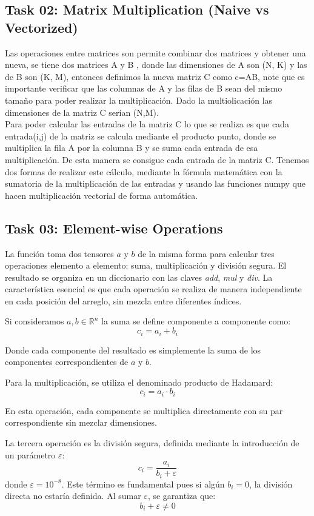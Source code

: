 \documentclass[12pt]{article}
\begin{document}
\subsection*{Task 02: Matrix Multiplication (Naive vs Vectorized)}
Las operaciones entre matrices son permite combinar dos matrices y obtener una nueva, se tiene dos matrices A
 y B , donde las dimensiones de A son (N, K) y las de B son (K, M), entonces definimos la nueva
  matriz C como c=AB, note que es importante verificar que las columnas de A y las filas de B sean del mismo tamaño
  para poder realizar la multiplicación. Dado la multiolicación las dimensiones de la matriz C serían (N,M).\\
Para poder calcular las entradas de la matriz C lo que se realiza es que cada entrada(i,j) de la matriz se calcula
 mediante el producto punto, donde se multiplica la fila A por la columna B y se suma cada entrada de esa multiplicación.
 De esta manera se consigue cada entrada de la matriz C. Tenemos dos formas de realizar este cálculo, mediante
  la fórmula matemática con la sumatoria de la multiplicación de las entradas y usando las funciones numpy
   que hacen multiplicación vectorial de forma automática.
\subsection*{Task 03: Element-wise Operations}

La función  toma dos tensores $a$ y $b$ de la misma forma para calcular tres operaciones elemento a elemento: suma, multiplicación y división segura. El resultado se organiza en un diccionario con las claves \textit{add}, \textit{mul} y \textit{div}. La característica esencial es que cada operación se realiza de manera independiente en cada posición del arreglo, sin mezcla entre diferentes índices.


Si consideramos $a, b \in \mathbb{R}^n$  la suma se define componente a componente como:
$$
    c_i = a_i + b_i
$$

Donde cada componente del resultado es simplemente la suma de los componentes correspondientes de $a$ y $b$.

Para la multiplicación, se utiliza el denominado producto de Hadamard:
$$
    c_i = a_i \cdot b_i 
$$

En esta operación, cada componente se multiplica directamente con su par correspondiente sin mezclar dimensiones. 

La tercera operación es la división segura, definida mediante la introducción de un parámetro $\varepsilon$:
$$    c_i = \frac{a_i}{b_i + \varepsilon}$$
donde $\varepsilon = 10^{-8}$. Este término es fundamental pues si algún $b_i = 0$, la división directa no estaría definida. Al sumar $\varepsilon$, se garantiza que:
$$
    b_i + \varepsilon \neq 0
$$
\end{document}
